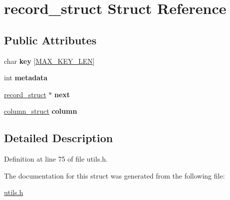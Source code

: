 \hypertarget{structrecord__struct}{\section{record\-\_\-struct Struct Reference}
\label{structrecord__struct}
}
\subsection*{Public Attributes}
\begin{DoxyCompactItemize}
\item 
\hypertarget{structrecord__struct_a2a8d3f8bd12046aed5172e1ea52061e3}{char {\bfseries key} \mbox{[}\hyperlink{storage_8h_ad91bfaf106e42aa552f1605c5b8a9ef2}{M\-A\-X\-\_\-\-K\-E\-Y\-\_\-\-L\-E\-N}\mbox{]}}\label{structrecord__struct_a2a8d3f8bd12046aed5172e1ea52061e3}

\item 
\hypertarget{structrecord__struct_a7f9754f46ded9d4d69c27a2ade4253a8}{int {\bfseries metadata}}\label{structrecord__struct_a7f9754f46ded9d4d69c27a2ade4253a8}

\item 
\hypertarget{structrecord__struct_a68280530603dd2930c1af94ecc85d658}{\hyperlink{structrecord__struct}{record\-\_\-struct} $\ast$ {\bfseries next}}\label{structrecord__struct_a68280530603dd2930c1af94ecc85d658}

\item 
\hypertarget{structrecord__struct_aeba01db49aba23a818d5c93887896240}{\hyperlink{structcolumn__struct}{column\-\_\-struct} {\bfseries column}}\label{structrecord__struct_aeba01db49aba23a818d5c93887896240}

\end{DoxyCompactItemize}


\subsection{Detailed Description}


Definition at line 75 of file utils.\-h.



The documentation for this struct was generated from the following file\-:\begin{DoxyCompactItemize}
\item 
\hyperlink{utils_8h}{utils.\-h}\end{DoxyCompactItemize}
